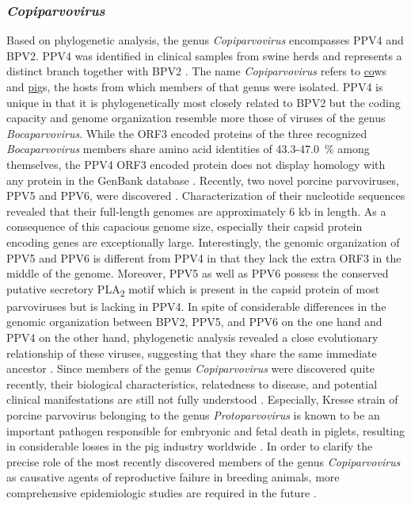 \subsubsection{\textit{Copiparvovirus}}
Based on phylogenetic analysis, the genus \textit{Copiparvovirus} encompasses PPV4 and BPV2. PPV4 was identified in clinical samples from swine herds \cite{pmid20339886, pmid21092136, pmid22967311} and represents a distinct branch together with BPV2 \cite{pmid11562506}. The name \textit{Copiparvovirus} refers to \underline{co}ws and \underline{pi}gs, the hosts from which members of that genus were isolated. PPV4 is unique in that it is phylogenetically most closely related to BPV2 but the coding capacity and genome organization resemble more those of viruses of the genus \textit{Bocaparvovirus}. While the ORF3 encoded proteins of the three recognized \textit{Bocaparvovirus} members share amino acid identities of 43.3-47.0~\% among themselves, the PPV4 ORF3 encoded protein does not display homology with any protein in the GenBank database \cite{pmid20339886, pmid21092136}. 
Recently, two novel porcine parvoviruses, PPV5 and PPV6, were discovered \cite{pmid23405295, pmid25442288}. Characterization of their nucleotide sequences revealed that their full-length genomes are approximately 6 kb in length. As a consequence of this capacious genome size, especially their capsid protein encoding genes are exceptionally large. Interestingly, the genomic organization of PPV5 and PPV6 is different from PPV4 in that they lack the extra ORF3 in the middle of the genome. Moreover, PPV5 as well as PPV6 possess the conserved putative secretory PLA\textsubscript{2} motif which is present in the capsid protein of most parvoviruses but is lacking in PPV4. In spite of considerable differences in the genomic organization between BPV2, PPV5, and PPV6 on the one hand and PPV4 on the other hand, phylogenetic analysis revealed a close evolutionary relationship of these viruses, suggesting that they share the same immediate ancestor \cite{pmid23762339, pmid25442288}.      
Since members of the genus \textit{Copiparvovirus} were discovered quite recently, their biological characteristics, relatedness to disease, and potential clinical manifestations are still not fully understood \cite{pmid20339886, pmid21092136, pmid23762339, pmid25442288}. Especially, Kresse strain of porcine parvovirus belonging to the genus \textit{Protoparvovirus} is known to be an important pathogen responsible for embryonic and fetal death in piglets, resulting in considerable losses in the pig industry worldwide \cite{pmid6314634, pmid427636, pmid999067, pmid3006323}. In order to clarify the precise role of the most recently discovered members of the genus \textit{Copiparvovirus} as causative agents of reproductive failure in breeding animals, more comprehensive epidemiologic studies are required in the future \cite{pmid25442288}. 



